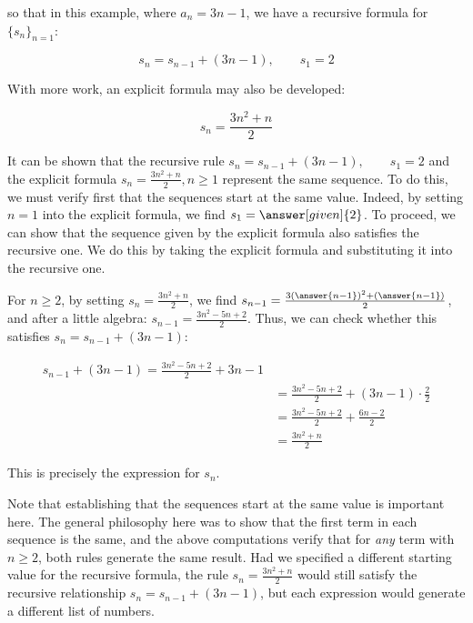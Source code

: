 \documentclass{ximera}
\begin{document}
\begin{example}
\begin{example}
\begin{explanation}
\begin{image}
  \end{image}
so that in this example, where $a_n = 3n-1$, we have a recursive formula for $\{s_n\}_{n=1}$:

\[
s_n = s_{n-1} + (3n-1), \qquad s_1 =2
\]  

With more work, an explicit formula may also be developed:

\[
s_n = \frac{3n^2+n}{2}
\]
    
\end{explanation}
\end{example}   
\end{example}

\begin{remark}
It can be shown that the recursive rule $s_n = s_{n-1} + (3n-1), \qquad s_1 =2$ and the explicit formula $s_n = \frac{3n^2+n}{2}
, n \geq 1$ represent the same sequence.  To do this, we must verify first that the sequences start at the same value.  Indeed, by setting $n=1$ into the explicit formula, we find $s_1 = \answer[given]{2}$.  To proceed, we can show that the sequence given by the explicit formula also satisfies the recursive one.  We do this by taking the explicit formula and substituting it into the recursive one.  

For $n \geq 2$, by setting $s_n = \frac{3n^2+n}{2}$, we find $s_{n-1} = \frac{3(\answer{n-1})^2+(\answer{n-1})}{2}$, and after a little algebra: $s_{n-1} = \frac{3n^2-5n+2}{2}$.  Thus, we can check whether this satisfies $s_n = s_{n-1} + (3n-1)$:

\begin{align*}
 s_{n-1} + (3n-1) = \frac{3n^2-5n+2}{2} +3n-1 \\
 &=  \frac{3n^2-5n+2}{2} +(3n-1) \cdot \frac{2}{2} \\ 
 &= \frac{3n^2-5n+2}{2} + \frac{6n-2}{2} \\
 &= \frac{3n^2+n}{2} 
\end{align*}

This is precisely the expression for $s_n$.

Note that establishing that the sequences start at the same value is important here.  The general philosophy here was to show that the first term in each sequence is the same, and the above computations verify that for \emph{any} term with $n \geq 2$, both rules generate the same result.  Had we specified a different starting value for the recursive formula, the rule $s_n = \frac{3n^2+n}{2}$ would still satisfy the recursive relationship $s_n = s_{n-1} + (3n-1)$, but each expression would generate a different list of numbers.

\end{remark}
\end{document}
